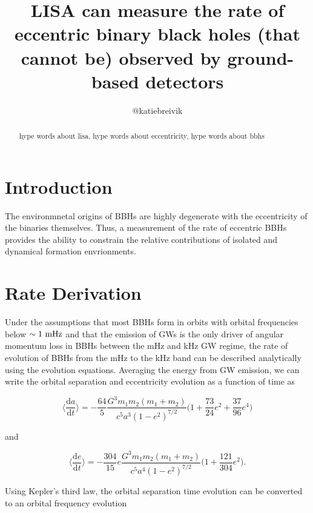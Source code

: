 \documentclass[twocolumn]{aastex631}
\begin{document}
\title{LISA can measure the rate of eccentric binary black holes (that cannot be) observed by ground-based detectors}

\author{@katiebreivik}

\begin{abstract}
    hype words about lisa, hype words about eccentricity, hype words about bbhs
\end{abstract}

\section{Introduction}
\label{sec:intro}

The environmnetal origins of BBHs are highly degenerate with the eccentricity of the binaries themselves. Thus, a measurement of the rate of eccentric BBHs provides the ability to constrain the relative contributions of isolated and dynamical formation envrionments. 

\section{Rate Derivation}
\label{sec:rates}
Under the assumptions that most BBHs form in orbits with orbital frequencies below $\sim 1~\rm{mHz}$ and that the emission of GWs is the only driver of angular momentum loss in BBHs between the mHz and kHz GW regime, the rate of evolution of BBHs from the mHz to the kHz band can be described analytically using the \citet{Peters1964} evolution equations. Averaging the energy from GW emission, we can write the orbital separation and eccentricity evolution as a function of time as

\begin{equation}
    \Big\langle \frac{\mathrm{d}a}{\mathrm{d}t} \Big\rangle = - \frac{64}{5} \frac{G^3 m_1 m_2 (m_1 + m_2)}{c^5 a^3 (1 - e^2)^{7/2}} \Big(1 + \frac{73}{24} e^2 + \frac{37}{96} e^4 \Big)
    \label{eq:dadt}
\end{equation}

\noindent and 

\begin{equation}
    \Big\langle\frac{\mathrm{d}e}{\mathrm{d}t}\Big\rangle = -\frac{304}{15} e \frac{G^3 m_1 m_2 (m_1 + m_2)}{c^5 a^4 (1-e^2)^{7/2}} \Big( 1 + \frac{121}{304} e^{2}\Big).
    \label{eq:dedt}
\end{equation}

Using Kepler's third law, the orbital separation time evolution can be converted to an orbital frequency evolution 
\end{document}
